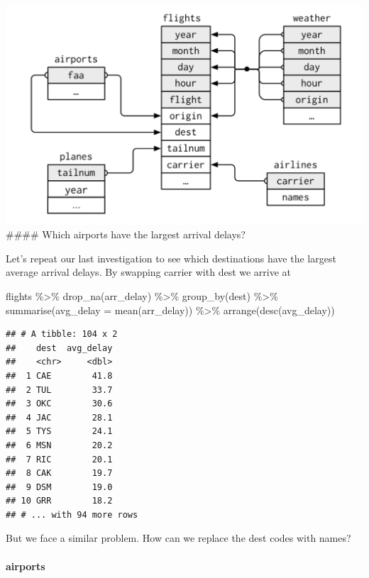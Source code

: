 \documentclass[
]{article}
\newenvironment{Shaded}{\begin{snugshade}}{\end{snugshade}}
\newcommand{\AttributeTok}[1]{\textcolor[rgb]{0.77,0.63,0.00}{#1}}
\newcommand{\FunctionTok}[1]{\textcolor[rgb]{0.00,0.00,0.00}{#1}}
\newcommand{\NormalTok}[1]{#1}
\newcommand{\SpecialCharTok}[1]{\textcolor[rgb]{0.00,0.00,0.00}{#1}}
\begin{document}
\includegraphics{data/nycflights13.png} \#\#\#\# Which airports have the
largest arrival delays?

Let's repeat our last investigation to see which destinations have the
largest average arrival delays. By swapping carrier with dest we arrive
at

\begin{Shaded}
\begin{Highlighting}[]
\NormalTok{flights }\SpecialCharTok{\%\textgreater{}\%} 
  \FunctionTok{drop\_na}\NormalTok{(arr\_delay) }\SpecialCharTok{\%\textgreater{}\%}
  \FunctionTok{group\_by}\NormalTok{(dest) }\SpecialCharTok{\%\textgreater{}\%}
  \FunctionTok{summarise}\NormalTok{(}\AttributeTok{avg\_delay =} \FunctionTok{mean}\NormalTok{(arr\_delay)) }\SpecialCharTok{\%\textgreater{}\%}
  \FunctionTok{arrange}\NormalTok{(}\FunctionTok{desc}\NormalTok{(avg\_delay))}
\end{Highlighting}
\end{Shaded}

\begin{verbatim}
## # A tibble: 104 x 2
##    dest  avg_delay
##    <chr>     <dbl>
##  1 CAE        41.8
##  2 TUL        33.7
##  3 OKC        30.6
##  4 JAC        28.1
##  5 TYS        24.1
##  6 MSN        20.2
##  7 RIC        20.1
##  8 CAK        19.7
##  9 DSM        19.0
## 10 GRR        18.2
## # ... with 94 more rows
\end{verbatim}

But we face a similar problem. How can we replace the dest codes with
names?

\hypertarget{airports}{%
\paragraph{airports}\label{airports}}
\end{document}
